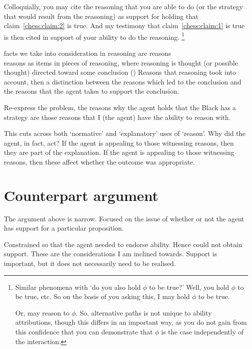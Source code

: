 \documentclass[10pt]{article}
\newcommand{\hozlinedash}[0]{%
  \noindent\hdashrule[0.5ex][c]{\textwidth}{.1pt}{2.5pt}
}
\begin{document}
Colloquially, you may cite the reasoning that you are able to do (or the strategy that would result from the reasoning) as support for holding that claim~\ref{chess:claim:2} is true.
And my testimony that claim~\ref{chess:claim:1} is true is then cited in support of your ability to do the reasoning.\nolinebreak
\footnote{
  Similar phenomena with `do you also hold \(\phi\) to be true?'
  Well, you hold \(\phi\) to be true, etc.
  So on the basis of you asking this, I may hold \(\phi\) to be true.

  Or, may reason to \(\phi\).
  So, alternative paths is not unique to ability attributions, though this differs in an important way, as you do not gain from this confidence that you can demonstrate that \(\phi\) is the case independently of the interaction.
}

{
  \color{red}
  facts we take into consideration in reasoning are reasons \\
  reasons as items in pieces of reasoning, where reasoning is thought (or possible thought) directed toward some conclusion (\citeyear[421]{Hieronymi:2011aa})
}
Reasons that reasoning took into account, then a distinction between the reasons which led to the conclusion and the reasons that the agent takes to support the conclusion.


Re-express the problem, the reasons why the agent holds that the Black has a strategy are those reasons that I (the agent) have the ability to reason with.

This cuts across both `normative' and `explanatory' uses of `reason'.
Why did the agent, in fact, act?
If the agent is appealing to those witnessing reasons, then they are part of the explanation.
If the agent is appealing to those witnessing reasons, then these affect whether the outcome was appropriate.

\hozlinedash



\section{Counterpart argument}
\label{sec:counterpart-argument}

The argument above is narrow.
Focused on the issue of whether or not the agent has support for a particular proposition.

Constrained so that the agent needed to endorse ability.
Hence could not obtain support.
These are the considerations I am inclined towards.
Support is important, but it does not necessarily need to be realised.
\end{document}
